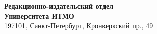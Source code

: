 \thispagestyle{empty}

\vspace*{\fill}

\noindent
\textbf{Редакционно-издательский отдел} \\ 
\textbf{Университета ИТМО} \\
197101, Санкт-Петербург, Кронверкский пр., 49
